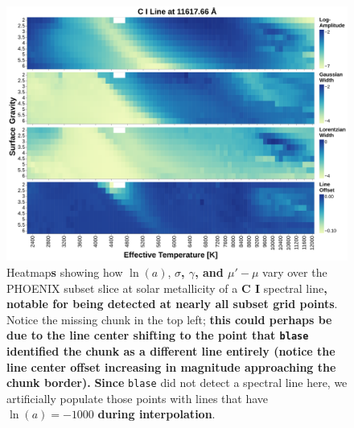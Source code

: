 \documentclass[twocolumn, linenumbers]{aastex631}
\begin{document}
\begin{figure}
    \centering
    \includegraphics[width=\textwidth]{figure3}
    \caption{Heatmap\textbf{s} showing how $\ln(a)$, $\sigma$\textbf{, $\gamma$, and $\mu' - \mu$} vary over the PHOENIX subset slice at solar metallicity of a \textbf{C I} spectral line\textbf{, notable for being detected at nearly all subset grid points}.
    Notice the missing chunk in the top left; \textbf{this could perhaps be due to the line center shifting to the point that \texttt{blase} identified the chunk as a different line entirely (notice the line center offset increasing in magnitude approaching the chunk border).}
    \textbf{Since} \texttt{blase} did not detect a spectral line here, we artificially populate those points with lines that have $\ln(a) = -1000$ \textbf{during interpolation}.}
    \label{fig:figure3}
\end{figure}
\end{document}
